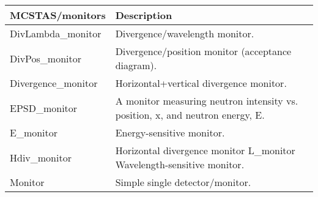 \begin{table}
  \begin{center}
    {\let\my=\\
    \begin{tabular}{|p{}|p{}|}
      \hline
       MCSTAS/monitors & Description \\ 
       \hline
DivLambda\_monitor &  Divergence/wavelength monitor. \\
DivPos\_monitor  &    Divergence/position
                    monitor (acceptance
                    diagram). \\
Divergence\_monitor &  Horizontal+vertical
                    divergence monitor. \\
EPSD\_monitor    &    A monitor measuring neutron
                    intensity vs. position, x,
                    and neutron energy, E. \\
E\_monitor       &    Energy-sensitive monitor. \\
Hdiv\_monitor    &    Horizontal divergence monitor
L\_monitor           Wavelength-sensitive monitor. \\
Monitor          &   Simple
                    single detector/monitor. \\
                    

\end{tabular}}
\end{center}
\end{table}
